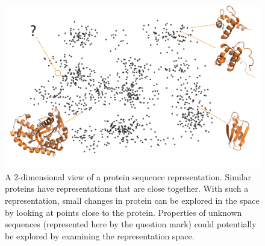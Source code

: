\documentclass[a4paper,11pt]{article}
\begin{document}
\begin{figure}[ht]
    \centering
    \includegraphics[width=\textwidth]{project_description/figure.pdf}
    \caption{A 2-dimensional view of a protein sequence representation. Similar proteins have representations that are close together. With such a representation, small changes in protein can be explored in the space by looking at points close to the protein. Properties of unknown sequences (represented here by the question mark) could potentially be explored by examining the representation space.}
    \label{fig:latentSpace}
\end{figure}




\end{document}
